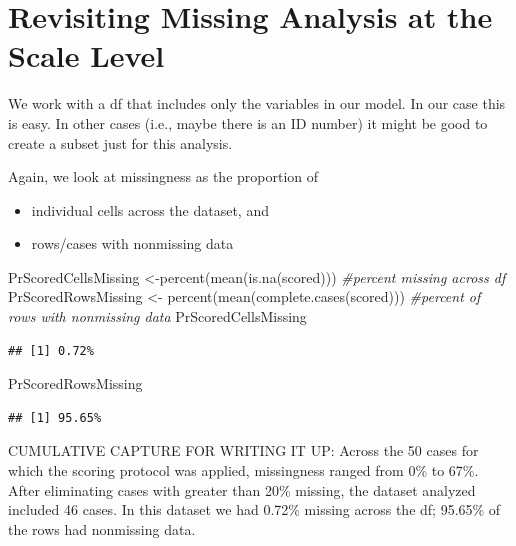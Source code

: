 \documentclass[
]{book}
\newenvironment{Shaded}{\begin{snugshade}}{\end{snugshade}}
\newcommand{\CommentTok}[1]{\textcolor[rgb]{0.56,0.35,0.01}{\textit{#1}}}
\newcommand{\FunctionTok}[1]{\textcolor[rgb]{0.00,0.00,0.00}{#1}}
\newcommand{\NormalTok}[1]{#1}
\newcommand{\OtherTok}[1]{\textcolor[rgb]{0.56,0.35,0.01}{#1}}
\providecommand{\tightlist}{%
  \setlength{\itemsep}{0pt}\setlength{\parskip}{0pt}}
\begin{document}
\hypertarget{revisiting-missing-analysis-at-the-scale-level}{%
\section{Revisiting Missing Analysis at the Scale Level}\label{revisiting-missing-analysis-at-the-scale-level}}

We work with a df that includes only the variables in our model. In our case this is easy. In other cases (i.e., maybe there is an ID number) it might be good to create a subset just for this analysis.

Again, we look at missingness as the proportion of

\begin{itemize}
\tightlist
\item
  individual cells across the dataset, and
\item
  rows/cases with nonmissing data
\end{itemize}

\begin{Shaded}
\begin{Highlighting}[]
\NormalTok{PrScoredCellsMissing }\OtherTok{\textless{}{-}}\FunctionTok{percent}\NormalTok{(}\FunctionTok{mean}\NormalTok{(}\FunctionTok{is.na}\NormalTok{(scored))) }\CommentTok{\#percent missing across df}
\NormalTok{PrScoredRowsMissing }\OtherTok{\textless{}{-}} \FunctionTok{percent}\NormalTok{(}\FunctionTok{mean}\NormalTok{(}\FunctionTok{complete.cases}\NormalTok{(scored))) }\CommentTok{\#percent of rows with nonmissing data}
\NormalTok{PrScoredCellsMissing}
\end{Highlighting}
\end{Shaded}

\begin{verbatim}
## [1] 0.72%
\end{verbatim}

\begin{Shaded}
\begin{Highlighting}[]
\NormalTok{PrScoredRowsMissing}
\end{Highlighting}
\end{Shaded}

\begin{verbatim}
## [1] 95.65%
\end{verbatim}

CUMULATIVE CAPTURE FOR WRITING IT UP: Across the 50 cases for which the scoring protocol was applied, missingness ranged from 0\% to 67\%. After eliminating cases with greater than 20\% missing, the dataset analyzed included 46 cases. In this dataset we had 0.72\% missing across the df; 95.65\% of the rows had nonmissing data.
\end{document}
